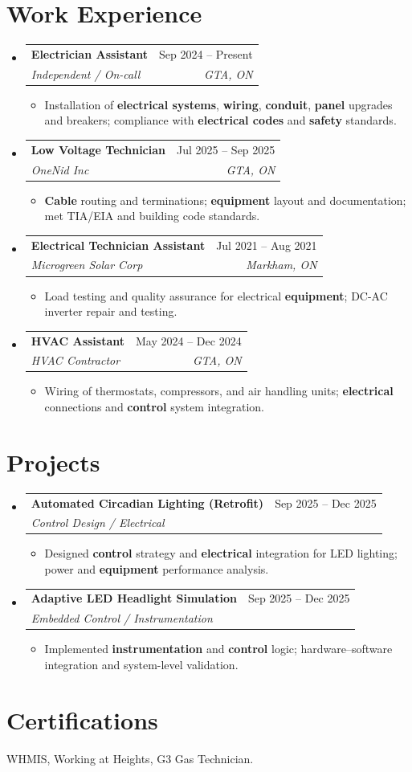 \documentclass[letterpaper,11pt]{article}
\makeatletter
\newcommand{\resumeItem}[1]{\item\small{{#1 \vspace{-2pt}}}}
\newcommand{\resumeSubheading}[4]{
  \vspace{-4pt}\item
    \begin{tabular*}{0.97\textwidth}[t]{l@{\extracolsep{\fill}}r}
      \textbf{#1} & #2 \\
      \textit{\small #3} & \textit{\small #4} \\
    \end{tabular*}\vspace{-8pt}
}
\newcommand{\resumeSubHeadingListStart}{\begin{itemize}[leftmargin=0.15in, label={}]}
\newcommand{\resumeSubHeadingListEnd}{\end{itemize}}
\newcommand{\resumeItemListStart}{\begin{itemize}}
\newcommand{\resumeItemListEnd}{\end{itemize}\vspace{-5pt}}
\makeatother
\begin{document}
\section{Work Experience}
\resumeSubHeadingListStart

\resumeSubheading
  {Electrician Assistant}{Sep 2024 -- Present}
  {Independent / On-call}{GTA, ON}
\resumeItemListStart
  \resumeItem{Installation of \textbf{electrical systems}, \textbf{wiring}, \textbf{conduit}, \textbf{panel} upgrades and breakers; compliance with \textbf{electrical codes} and \textbf{safety} standards.}
\resumeItemListEnd

\resumeSubheading
  {Low Voltage Technician}{Jul 2025 -- Sep 2025}
  {OneNid Inc}{GTA, ON}
\resumeItemListStart
  \resumeItem{\textbf{Cable} routing and terminations; \textbf{equipment} layout and documentation; met TIA/EIA and building code standards.}
\resumeItemListEnd

\resumeSubheading
  {Electrical Technician Assistant}{Jul 2021 -- Aug 2021}
  {Microgreen Solar Corp}{Markham, ON}
\resumeItemListStart
  \resumeItem{Load testing and quality assurance for electrical \textbf{equipment}; DC-AC inverter repair and testing.}
\resumeItemListEnd

\resumeSubheading
  {HVAC Assistant}{May 2024 -- Dec 2024}
  {HVAC Contractor}{GTA, ON}
\resumeItemListStart
  \resumeItem{Wiring of thermostats, compressors, and air handling units; \textbf{electrical} connections and \textbf{control} system integration.}
\resumeItemListEnd

\resumeSubHeadingListEnd

\section{Projects}
\resumeSubHeadingListStart
\resumeSubheading
  {Automated Circadian Lighting (Retrofit)}{Sep 2025 -- Dec 2025}
  {Control Design / Electrical}{ }
\resumeItemListStart
  \resumeItem{Designed \textbf{control} strategy and \textbf{electrical} integration for LED lighting; power and \textbf{equipment} performance analysis.}
\resumeItemListEnd
\resumeSubheading
  {Adaptive LED Headlight Simulation}{Sep 2025 -- Dec 2025}
  {Embedded Control / Instrumentation}{ }
\resumeItemListStart
  \resumeItem{Implemented \textbf{instrumentation} and \textbf{control} logic; hardware--software integration and system-level validation.}
\resumeItemListEnd
\resumeSubHeadingListEnd

\section{Certifications}
WHMIS, Working at Heights, G3 Gas Technician.
\end{document}
